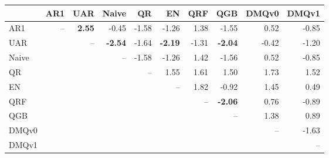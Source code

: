 \begin{tabular}{lrrrrrrrrr}
\toprule
 & AR1 & UAR & Naive & QR & EN & QRF & QGB & DMQv0 & DMQv1 \\
\midrule
AR1 & -- & \textbf{2.55} & -0.45 & -1.58 & -1.26 & 1.38 & -1.55 & 0.52 & -0.85 \\
UAR &  & -- & \textbf{-2.54} & -1.64 & \textbf{-2.19} & -1.31 & \textbf{-2.04} & -0.42 & -1.20 \\
Naive &  &  & -- & -1.58 & -1.26 & 1.42 & -1.56 & 0.52 & -0.85 \\
QR &  &  &  & -- & 1.55 & 1.61 & 1.50 & 1.73 & 1.52 \\
EN &  &  &  &  & -- & 1.82 & -0.92 & 1.45 & 0.49 \\
QRF &  &  &  &  &  & -- & \textbf{-2.06} & 0.76 & -0.89 \\
QGB &  &  &  &  &  &  & -- & 1.38 & 0.89 \\
DMQv0 &  &  &  &  &  &  &  & -- & -1.63 \\
DMQv1 &  &  &  &  &  &  &  &  & -- \\
\bottomrule
\end{tabular}
